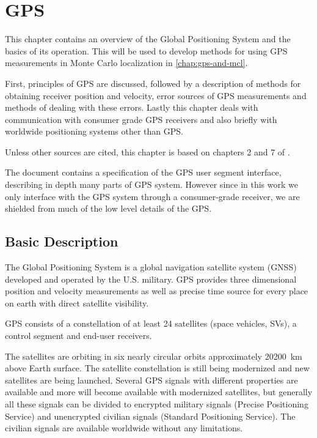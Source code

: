 \chapter{GPS}
\label{chap:gps}

This chapter contains an overview of the Global Positioning System and
the basics of its operation.
This will be used to develop methods for using GPS
measurements in Monte Carlo localization in \cref{chap:gps-and-mcl}.

First, principles of GPS are discussed, followed by a description of methods for
obtaining receiver position and velocity,
error sources of GPS measurements and methods of dealing with these errors.
Lastly this chapter deals with communication with consumer grade GPS receivers
and also briefly with worldwide positioning systems other than GPS.

Unless other sources are cited, this chapter is based on chapters
2 and 7 of \cite{kaplan06}.

The document \cite{fyfe92} contains a specification of the GPS user
segment interface, describing in depth many parts of GPS system.
However since in this work we only interface with the GPS system through a
consumer-grade receiver, we are shielded from much of the low level details of
the GPS.

\section{Basic Description}

The Global Positioning System is a global navigation satellite system (GNSS)
developed and operated by the U.S. military.
GPS provides three dimensional position and velocity measurements as well as
precise time source for every place on earth with direct satellite visibility.

GPS consists of a constellation of at least 24 satellites (space vehicles, SVs),
a control segment and end-user receivers.

The satellites are orbiting in six nearly circular orbits approximately \SI{20200}{\kilo\meter}
above Earth surface.
The satellite constellation is still being modernized \cite{gps-modernization-www}
and new satellites are being launched.
Several GPS signals with different properties are available and more will become available
with modernized satellites,
but generally all these signals can be divided to encrypted military signals 
(Precise Positioning Service) and unencrypted
civilian signals (Standard Positioning Service).
The civilian signals are available worldwide without any limitations.


